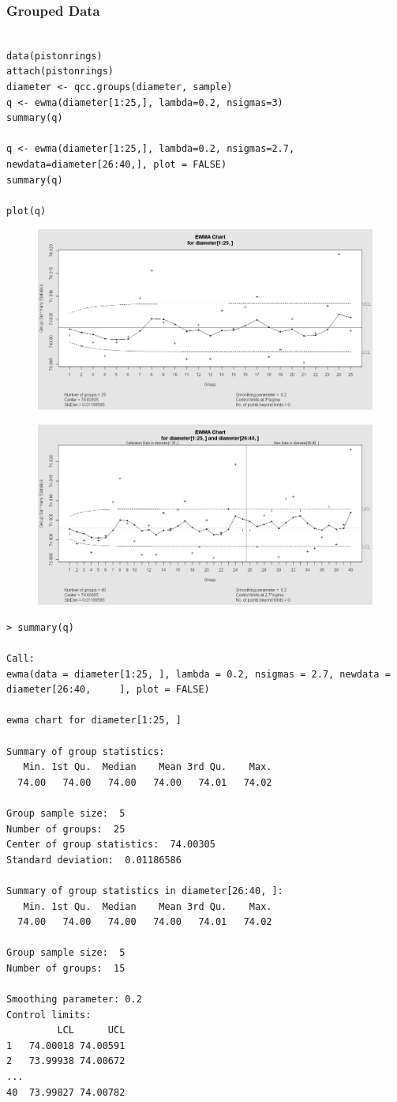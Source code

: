 \documentclass[]{article}
\begin{document}
\subsubsection{Grouped Data}
\begin{framed}
\begin{verbatim}

data(pistonrings)
attach(pistonrings)
diameter <- qcc.groups(diameter, sample)
q <- ewma(diameter[1:25,], lambda=0.2, nsigmas=3)
summary(q)

q <- ewma(diameter[1:25,], lambda=0.2, nsigmas=2.7,
newdata=diameter[26:40,], plot = FALSE)
summary(q)

plot(q)
\end{verbatim}
\end{framed}

\begin{figure}[h!]
\centering
\includegraphics[width=0.6\linewidth]{./qccEWMA1}
\caption{}
\label{fig:qccEWMA1}
\end{figure}
\begin{figure}[h!]
\centering
\includegraphics[width=0.6\linewidth]{./qccEWMA2}
\caption{}
\label{fig:qccEWMA2}
\end{figure}
\begin{verbatim}
> summary(q)

Call:
ewma(data = diameter[1:25, ], lambda = 0.2, nsigmas = 2.7, newdata = diameter[26:40,     ], plot = FALSE)

ewma chart for diameter[1:25, ] 

Summary of group statistics:
   Min. 1st Qu.  Median    Mean 3rd Qu.    Max. 
  74.00   74.00   74.00   74.00   74.01   74.02 

Group sample size:  5
Number of groups:  25
Center of group statistics:  74.00305
Standard deviation:  0.01186586 

Summary of group statistics in diameter[26:40, ]:
   Min. 1st Qu.  Median    Mean 3rd Qu.    Max. 
  74.00   74.00   74.00   74.00   74.01   74.02 

Group sample size:  5
Number of groups:  15 

Smoothing parameter: 0.2 
Control limits:
         LCL      UCL
1   74.00018 74.00591
2   73.99938 74.00672
...                  
40  73.99827 74.00782

\end{verbatim}
\newpage
\end{document}
